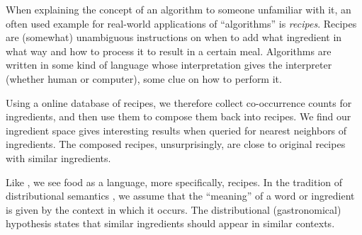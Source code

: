 When explaining the concept of an algorithm to someone unfamiliar with it, an often used example for real-world applications of ``algorithms'' is \textit{recipes}. Recipes are (somewhat) unambiguous instructions on when to add what ingredient in what way and how to process it to result in a certain meal. Algorithms are written in some kind of language whose interpretation gives the interpreter (whether human or computer), some clue on how to perform it.

Using a online database of recipes, we therefore collect co-occurrence counts for ingredients, and then use them to compose them back into recipes. We find our ingredient space gives interesting results when queried for nearest neighbors of ingredients. The composed recipes, unsurprisingly, are close to original recipes with similar ingredients.

Like \cite{jurafsky2014language}, we see food as a language, more specifically, recipes. In the tradition of distributional semantics \citep{TurneyPantel}, we assume that the ``meaning'' of a word or ingredient is given by the context in which it occurs. The distributional (gastronomical) hypothesis states that similar ingredients should appear in similar contexts.
